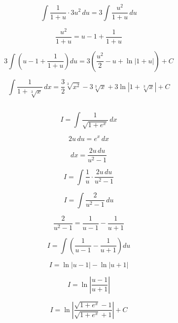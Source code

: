 \documentclass[12pt]{article}
\begin{document}
	\[
	\int \frac{1}{1 + u} \cdot 3u^2 \, du = 3 \int \frac{u^2}{1 + u} \, du
	\]
	

	
	\[
	\frac{u^2}{1 + u} = u - 1 + \frac{1}{1 + u}
	\]
	

	
	\[
	3 \int \left( u - 1 + \frac{1}{1 + u} \right) du = 3 \left( \frac{u^2}{2} - u + \ln |1 + u| \right) + C
	\]
	

	
	\[
	\int \frac{1}{1 + \sqrt[3]{x}} \, dx = \frac{3}{2} \sqrt[3]{x^2} - 3 \sqrt[3]{x} + 3 \ln |1 + \sqrt[3]{x}| + C
	\]
	




\subsection{}	

	\[
	I = \int \frac{1}{\sqrt{1+e^x}} \, dx
	\]
	

	
	\[
	2u \, du = e^x \, dx
	\]
	

	
	\[
	dx = \frac{2u \, du}{u^2 - 1}
	\]
	

	
	\[
	I = \int \frac{1}{u} \cdot \frac{2u \, du}{u^2 - 1}
	\]
	

	
	\[
	I = \int \frac{2}{u^2 - 1} \, du
	\]
	

	
	\[
	\frac{2}{u^2 - 1} = \frac{1}{u - 1} - \frac{1}{u + 1}
	\]
	

	
	\[
	I = \int \left( \frac{1}{u - 1} - \frac{1}{u + 1} \right) du
	\]
	

	
	\[
	I = \ln|u - 1| - \ln|u + 1|
	\]
	

	
	\[
	I = \ln \left| \frac{u - 1}{u + 1} \right|
	\]
	

	
	\[
	I = \ln \left| \frac{\sqrt{1 + e^x} - 1}{\sqrt{1 + e^x} + 1} \right| + C
	\]
	
\subsection{}	
\end{document}
